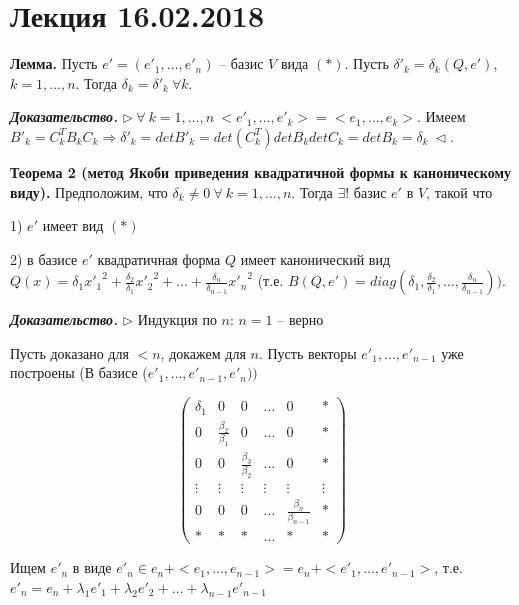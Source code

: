 \section{Лекция 16.02.2018}

\vspace{\baselineskip}
\textbf{Лемма.} Пусть $e' = (e'_1, \dots, e'_n)$ -- базис $V$ вида $(*)$. Пусть $\delta'_k = \delta_k(Q, e')$, $k = 1, \dots, n$. Тогда $\delta_k = \delta'_k \ \forall k$.

\vspace{\baselineskip}
\textbf{\textit{Доказательство.}} $\rhd \ \forall \ k =1, \dots, n \ <e'_1, \dots, e'_k> = <e_1, \dots, e_k>$. Имеем $B'_k = C_k^T B_k C_k \Rightarrow \delta'_k = det B'_k = det(C_k^T) det B_k det C_k = det B_k = \delta_k \ \lhd$.

\vspace{\baselineskip}
\textbf{Теорема 2 (метод Якоби приведения квадратичной формы к каноническому виду).} Предположим, что $\delta_k \neq 0 \ \forall \ k =1, \dots, n$. Тогда $\exists !$ базис $e'$ в $V$, такой что

1) $e'$ имеет вид $(*)$

2) в базисе $e'$ квадратичная форма $Q$ имеет канонический вид $Q(x) = \delta_1 {x'_1}^2 + \frac{\delta_2}{\delta_1} {x'_2}^2 + \dots + \frac{\delta_n}{\delta_{n-1}} {x'_n}^2$ (т.е. $B(Q, e') = diag(\delta_1, \frac{\delta_2}{\delta_1}, \dots, \frac{\delta_n}{\delta_{n-1}}))$.

\vspace{\baselineskip}
\textbf{\textit{Доказательство.}} $\rhd$ Индукция по $n$: $n = 1$ -- верно

Пусть доказано для $<n$, докажем для $n$. Пусть векторы $e'_1, \dots, e'_{n-1}$ уже построены (В базисе ($e'_1, \dots, e'_{n-1}, e'_n))$

\[ \begin{pmatrix} \delta_1 & 0 & 0 & \dots & 0 & * \\ 0 & \frac{\beta_2}{\beta_1} & 0 & \dots & 0 & * \\ 0 & 0 & \frac{\beta_3}{\beta_2} & \dots & 0 & * \\ \vdots & \vdots & \vdots & \vdots & \vdots & \vdots \\ 0 & 0 & 0 & \dots & \frac{\beta_n}{\beta_{n-1}} & * \\ * & * & * & \dots & * & * \end{pmatrix}
\]

\vspace{\baselineskip}
Ищем $e'_n$ в виде $e'_n \in e_n + <e_1, \dots, e_{n-1}> = e_n + <e'_1, \dots, e'_{n-1}>$, т.е. $e'_n = e_n + \lambda_1 e'_1 + \lambda_2 e'_2 + \dots + \lambda_{n-1} e'_{n-1}$

